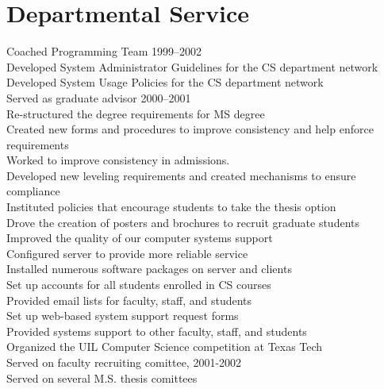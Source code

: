 \documentclass[11pt]{resume}
\begin{document}
\section{Departmental Service}{}
{\tenure Coached Programming Team 1999--2002\\
  Developed System Administrator Guidelines for the CS department network\\
  Developed System Usage Policies for the CS department network\\
 Served as graduate advisor 2000--2001\\
\hspace*{1em} Re-structured the degree requirements for MS degree\\
\hspace*{1em} Created new forms and procedures to improve consistency and help enforce requirements\\
\hspace*{1em} Worked to improve consistency in admissions.\\
\hspace*{1em} Developed new leveling requirements and created mechanisms to ensure compliance\\
\hspace*{1em} Instituted policies that encourage students to take the thesis option\\
\hspace*{1em} Drove the creation of posters and brochures to recruit graduate students\\
Improved the quality of our computer systems support\\
\hspace*{1em} Configured server to provide more reliable service\\
\hspace*{1em} Installed numerous software packages on server and clients\\
\hspace*{1em} Set up accounts for all students enrolled in CS courses\\
\hspace*{1em} Provided email lists for faculty, staff, and students\\
\hspace*{1em} Set up web-based system support request forms\\
\hspace*{1em} Provided systems support to other
faculty, staff, and students\\
Organized the UIL Computer Science competition at Texas Tech\\
Served on faculty recruiting comittee, 2001-2002\\
Served on several M.S. thesis comittees
}
\end{document}
